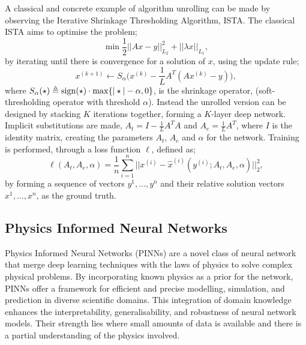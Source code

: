 \IEEEPARstart{}{} A classical and concrete example of algorithm unrolling can be made by observing the Iterative Shrinkage Thresholding Algorithm, ISTA. The classical ISTA aims to optimise the problem;
\begin{equation}
\min \frac{1}{2} ||Ax - y||^2_{L_2} + ||\lambda x||_{L_1}, 
\end{equation}
by iterating until there is convergence for a solution of $x$, using the update rule;
\begin{equation}
	x^{(k+1)} \leftarrow S_{\alpha} \Big(x^{(k)} - \frac{1}{L} A^T(A x^{(k)} - y)\Big),
\end{equation}
where $S_{\alpha}(\star) \triangleq \operatorname*{\mathrm{sign}}(\star) \cdot \max \{|\star| - \alpha, 0\}$, is the shrinkage operator, (soft-thresholding operator with threshold $\alpha$). Instead the unrolled version can be designed by stacking $K$ iterations together, forming a $K$-layer deep network. Implicit substitutions are made, $A_t = I - \frac{1}{L}A^T A$ and $A_e = \frac{1}{L}A^T$, where $I$ is the identity matrix, creating the parameters $A_t$, $A_e$ and $\alpha$ for the network. Training is performed, through a loss function $\ell$, defined as;
\begin{equation}
	\ell(A_t, A_e, \alpha) = \frac{1}{n} \sum_{i=1}^{n} \big|\big|x^{(i)} - \hat{x}^{(i)}(y^{(i)};A_t,A_e,\alpha)\big|\big|^2_2,
\end{equation}
by forming a sequence of vectors $y^{1}, \dots, y^{n}$ and their relative solution vectors $x^1, \dots, x^n$, as the ground truth. 

\subsection{Physics Informed Neural Networks}

\IEEEPARstart{}{} Physics Informed Neural Networks (PINNs) are a novel class of neural network that merge deep learning techniques with the laws of physics to solve complex physical problems. By incorporating known physics as a prior for the network, PINNs offer a framework for efficient and precise modelling, simulation, and prediction in diverse scientific domains. This integration of domain knowledge enhances the interpretability, generalisability, and robustness of neural network models. Their strength lies where small amounts of data is available and there is a partial understanding of the physics involved.  

